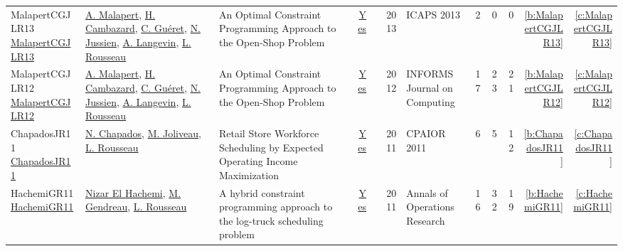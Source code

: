 {\begin{longtable}{>{\raggedright\arraybackslash}p{3cm}>{\raggedright\arraybackslash}p{6cm}>{\raggedright\arraybackslash}p{6.5cm}rrrp{2.5cm}rrrrr}
MalapertCGJLR13 \href{http://www.aaai.org/ocs/index.php/ICAPS/ICAPS13/paper/view/6016}{MalapertCGJLR13} & \hyperref[auth:a82]{A. Malapert}, \hyperref[auth:a1025]{H. Cambazard}, \hyperref[auth:a296]{C. Gu{\'{e}}ret}, \hyperref[auth:a250]{N. Jussien}, \hyperref[auth:a655]{A. Langevin}, \hyperref[auth:a332]{L. Rousseau} & An Optimal Constraint Programming Approach to the Open-Shop Problem & \href{works/MalapertCGJLR13.pdf}{Yes} & \cite{MalapertCGJLR13} & 2013 & ICAPS 2013 & 2 & 0 & 0 & \ref{b:MalapertCGJLR13} & \ref{c:MalapertCGJLR13}\\
MalapertCGJLR12 \href{https://doi.org/10.1287/ijoc.1100.0446}{MalapertCGJLR12} & \hyperref[auth:a82]{A. Malapert}, \hyperref[auth:a1025]{H. Cambazard}, \hyperref[auth:a296]{C. Gu{\'{e}}ret}, \hyperref[auth:a250]{N. Jussien}, \hyperref[auth:a655]{A. Langevin}, \hyperref[auth:a332]{L. Rousseau} & An Optimal Constraint Programming Approach to the Open-Shop Problem & \href{works/MalapertCGJLR12.pdf}{Yes} & \cite{MalapertCGJLR12} & 2012 & INFORMS Journal on Computing & 17 & 23 & 21 & \ref{b:MalapertCGJLR12} & \ref{c:MalapertCGJLR12}\\
ChapadosJR11 \href{https://doi.org/10.1007/978-3-642-21311-3\_7}{ChapadosJR11} & \hyperref[auth:a350]{N. Chapados}, \hyperref[auth:a351]{M. Joliveau}, \hyperref[auth:a332]{L. Rousseau} & Retail Store Workforce Scheduling by Expected Operating Income Maximization & \href{works/ChapadosJR11.pdf}{Yes} & \cite{ChapadosJR11} & 2011 & CPAIOR 2011 & 6 & 5 & 12 & \ref{b:ChapadosJR11} & \ref{c:ChapadosJR11}\\
HachemiGR11 \href{https://doi.org/10.1007/s10479-010-0698-x}{HachemiGR11} & \hyperref[auth:a625]{Nizar El Hachemi}, \hyperref[auth:a626]{M. Gendreau}, \hyperref[auth:a332]{L. Rousseau} & A hybrid constraint programming approach to the log-truck scheduling problem & \href{works/HachemiGR11.pdf}{Yes} & \cite{HachemiGR11} & 2011 & Annals of Operations Research & 16 & 32 & 19 & \ref{b:HachemiGR11} & \ref{c:HachemiGR11}\\
\end{longtable}
}

